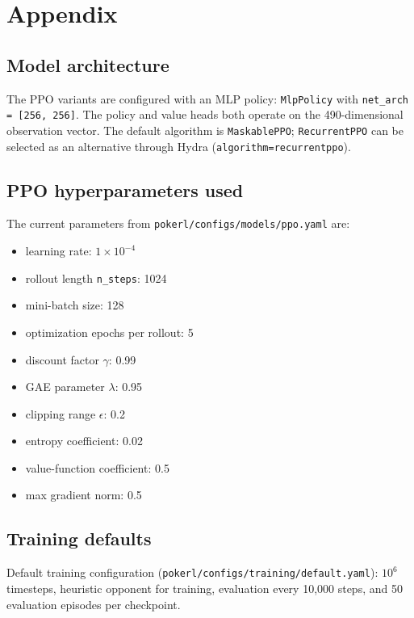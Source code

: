 \section{Appendix}
\label{section:appendix}

\subsection*{Model architecture}

The PPO variants are configured with an MLP policy:
\texttt{MlpPolicy} with \texttt{net\_arch = [256, 256]}.
The policy and value heads both operate on the 490-dimensional observation vector.
The default algorithm is \texttt{MaskablePPO}; \texttt{RecurrentPPO} can be selected as an alternative
through Hydra (\texttt{algorithm=recurrentppo}).

\subsection*{PPO hyperparameters used}

The current parameters from \texttt{pokerl/configs/models/ppo.yaml} are:
\begin{itemize}
    \item learning rate: \(1\times10^{-4}\)
    \item rollout length \texttt{n\_steps}: 1024
    \item mini-batch size: 128
    \item optimization epochs per rollout: 5
    \item discount factor \(\gamma\): 0.99
    \item GAE parameter \(\lambda\): 0.95
    \item clipping range \(\epsilon\): 0.2
    \item entropy coefficient: 0.02
    \item value-function coefficient: 0.5
    \item max gradient norm: 0.5
\end{itemize}

\subsection*{Training defaults}

Default training configuration (\texttt{pokerl/configs/training/default.yaml}):
\(10^6\) timesteps, heuristic opponent for training, evaluation every 10,000 steps,
and 50 evaluation episodes per checkpoint.
